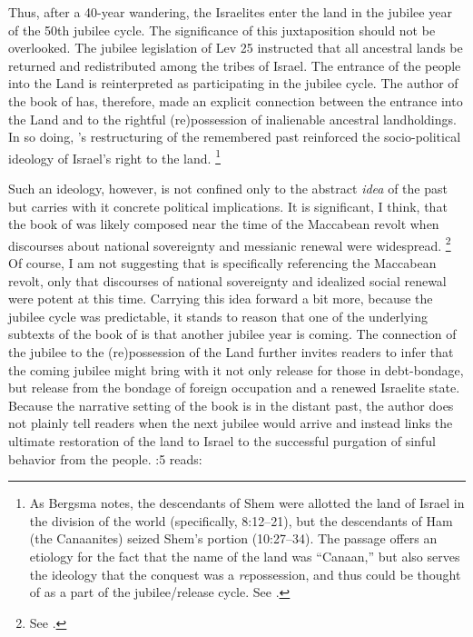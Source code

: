 \noindent
Thus, after a 40-year wandering, the Israelites enter the land in the jubilee year of the 50th jubilee cycle. The significance of this juxtaposition should not be overlooked. The jubilee legislation of Lev 25 instructed that all ancestral lands be returned and redistributed among the tribes of Israel. The entrance of the people into the Land is reinterpreted as participating in the jubilee cycle. The author of the book of \jub has, therefore, made an explicit connection between the entrance into the Land and to the rightful (re)possession of inalienable ancestral landholdings. In so doing, \jub's restructuring of the remembered past reinforced the socio-political ideology of Israel's right to the land.%
    \footnote{%
        As Bergsma notes, the descendants of Shem were allotted the land of Israel in the division of the world (specifically, 8:12--21), but the descendants of Ham (the Canaanites) seized Shem's portion (10:27--34). The passage offers an etiology for the fact that the name of the land was ``Canaan,'' but also serves the ideology that the conquest was a \emph{re}possession, and thus could be thought of as a part of the jubilee/release cycle. See 
        \cite[234--35]{bergsma2007}.}

Such an ideology, however, is not confined only to the abstract \emph{idea} of the past but carries with it concrete political implications. It is significant, I think, that the book of \jub was likely composed near the time of the Maccabean revolt when discourses about national sovereignty and messianic renewal were widespread.%
    \footnote{%
        See \cite[31--38]{vanderkam2018}.}
Of course, I am not suggesting that \jub is specifically referencing the Maccabean revolt, only that discourses of national sovereignty and idealized social renewal were potent at this time. Carrying this idea forward a bit more, because the jubilee cycle was predictable, it stands to reason that one of the underlying subtexts of the book of \jub is that another jubilee year is coming. The connection of the jubilee to the (re)possession of the Land further invites readers to infer that the coming jubilee might bring with it not only release for those in debt-bondage, but release from the bondage of foreign occupation and a renewed Israelite state. Because the narrative setting of the book is in the distant past, the author does not plainly tell readers when the next jubilee would arrive and instead links the ultimate restoration of the land to Israel to the successful purgation of sinful behavior from the people. :5 reads:

